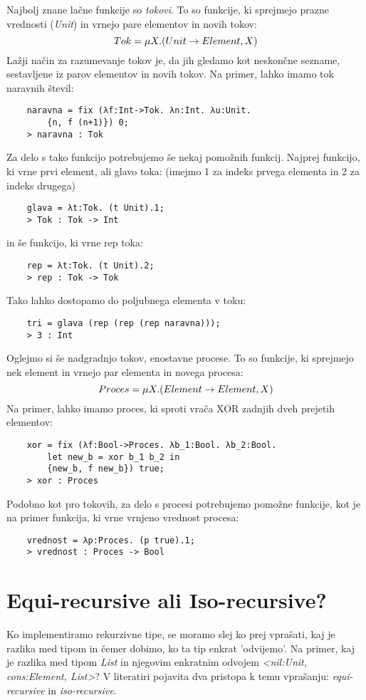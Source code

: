 \documentclass[12pt,a4paper,openany]{book}
\begin{document}
Najbolj znane lačne funkcije so \emph{tokovi}. To so funkcije, ki sprejmejo prazne vrednosti (\emph{Unit}) in vrnejo pare elementov in novih tokov:
\begin{equation}
    Tok = \mu X. (Unit \rightarrow {Element, X}) \notag
\end{equation}
Lažji način za razumevanje tokov je, da jih gledamo kot neskončne sezname, sestavljene iz parov elementov in novih tokov. Na primer, lahko imamo tok naravnih števil:
\begin{lstlisting}
    naravna = fix (λf:Int->Tok. λn:Int. λu:Unit. 
        {n, f (n+1)}) 0;
    > naravna : Tok
\end{lstlisting}
Za delo s tako funkcijo potrebujemo še nekaj pomožnih funkcij. Najprej funkcijo, ki vrne prvi element, ali glavo toka: (imejmo 1 za indeks prvega elementa in 2 za indeks drugega)
\begin{lstlisting}
    glava = λt:Tok. (t Unit).1;
    > Tok : Tok -> Int
\end{lstlisting}
in še funkcijo, ki vrne rep toka:
\begin{lstlisting}
    rep = λt:Tok. (t Unit).2;
    > rep : Tok -> Tok
\end{lstlisting}
Tako lahko dostopamo do poljubnega elementa v toku:
\begin{lstlisting}
    tri = glava (rep (rep (rep naravna)));
    > 3 : Int
\end{lstlisting}

Oglejmo si še nadgradnjo tokov, enostavne procese. To so funkcije, ki sprejmejo nek element in vrnejo par elementa in novega procesa:
\begin{equation}
    Proces = \mu X. (Element \rightarrow {Element, X}) \notag
\end{equation}
Na primer, lahko imamo proces, ki sproti vrača XOR zadnjih dveh prejetih elementov:
\begin{lstlisting}
    xor = fix (λf:Bool->Proces. λb_1:Bool. λb_2:Bool. 
        let new_b = xor b_1 b_2 in
        {new_b, f new_b}) true;
    > xor : Proces
\end{lstlisting}
Podobno kot pro tokovih, za delo s procesi potrebujemo pomožne funkcije, kot je na primer funkcija, ki vrne vrnjeno vrednost procesa:
\begin{lstlisting}
    vrednost = λp:Proces. (p true).1;
    > vrednost : Proces -> Bool
\end{lstlisting}


\section{Equi-recursive ali Iso-recursive?}
Ko implementiramo rekurzivne tipe, se moramo slej ko prej vprašati, kaj je razlika med tipom in čemer dobimo, ko ta tip enkrat 'odvijemo'. Na primer, kaj je razlika med tipom \emph{List}
in njegovim enkratnim odvojem \emph{<nil:Unit, cons:{Element, List}>}? V literatiri pojavita dva pristopa k temu vprašanju: \emph{equi-recursive} in \emph{iso-recursive}.
\end{document}
